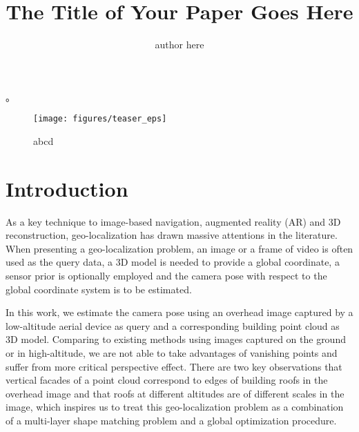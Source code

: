 \documentclass[tog]{acmsiggraph}
\title{The Title of Your Paper Goes Here}
\author{author here}
\begin{document}
	
	
	
	
	\maketitle
	

	
	\copyrightspace。
 \begin{figure*}
 	\centering
 	\vspace{2.0cm}
 	\texttt{[image: figures/teaser\_eps]}
 	\caption{abcd}
 	\label{fig:overview}
 \end{figure*}
\section{Introduction}
%
As a key technique to image-based navigation, augmented reality (AR) and 3D reconstruction, geo-localization has drawn massive attentions in the literature. When presenting a geo-localization problem, an image or a frame of video is often used as the query data, a 3D model is needed to provide a global coordinate, a sensor prior is optionally employed and the camera pose with respect to the global coordinate system is to be estimated. 

In this work, we estimate the camera pose using an overhead image captured by a low-altitude aerial device as query and a corresponding building point cloud as 3D model. Comparing to existing methods using images captured on the ground or in high-altitude, we are not able to take advantages of vanishing points and suffer from more critical perspective effect. There are two key observations that vertical facades of a point cloud correspond to edges of building roofs in the overhead image and that roofs at different altitudes are of different scales in the image, which inspires us to treat this geo-localization problem as a combination of a multi-layer shape matching problem and a global optimization procedure. 
%
\end{document}
